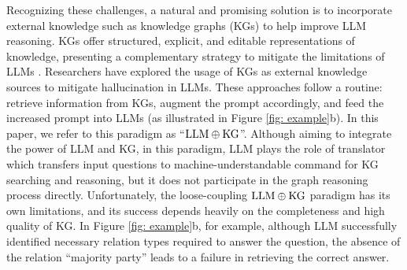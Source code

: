 \documentclass{article} %
\begin{document}

Recognizing these challenges, a natural and promising solution is to incorporate external knowledge such as knowledge graphs (KGs) to help improve LLM reasoning.
KGs offer structured, explicit, and editable representations of knowledge, presenting a complementary strategy to mitigate the limitations of LLMs \citep{pan2023unifying}.
Researchers \citep{cok, skg, knowledgeaugmented, yang2023chatgpt, wang2023boosting, structgpt} have explored the usage of KGs as external knowledge sources to mitigate hallucination in LLMs. These approaches follow a routine: retrieve information from KGs, augment the prompt accordingly, and feed the increased prompt into LLMs (as illustrated in Figure \ref{fig: example}b). In this paper, we refer to this paradigm as ``$\hbox{LLM}\oplus\hbox{KG}$''.
Although aiming to integrate the power of LLM and KG, in this paradigm, LLM plays the role of translator which transfers input questions to machine-understandable command for KG searching and reasoning, but it does not participate in the graph reasoning process directly. Unfortunately, the loose-coupling $\hbox{LLM}\oplus\hbox{KG}$ paradigm has its own limitations, and its success depends heavily on the completeness and high quality of KG. In Figure \ref{fig: example}b, for example, although LLM successfully identified necessary relation types required to answer the question, the absence of the relation ``majority party'' leads to a failure in retrieving the correct answer.
\end{document}
